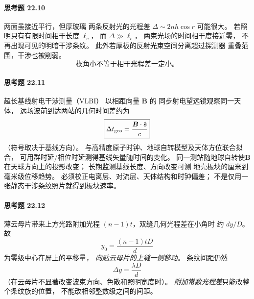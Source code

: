 \paragraph{思考题 22.10}
两面虽接近平行，但厚玻璃
两条反射光的光程差
\(\Delta\sim2nh\cos r\) 可能很大。
若照明只有有限时间相干长度 \(\ell_c\)，
而 \(\Delta\gg\ell_c\)，
两束光场的时间相干度接近零，
不再出现可见的明暗干涉条纹。
此外若厚板的反射光束空间分离超过探测器
重叠范围，干涉也被削弱。
\[
\boxed{\text{楔角小不等于相干光程差一定小。}}
\]

\paragraph{思考题 22.11}
超长基线射电干涉测量（VLBI）
以相距向量 \(\boldsymbol B\) 的
同步射电望远镜观察同一天体，
远场波前到达两站的几何时间差约为
\[
\boxed{\Delta t_{\rm geo}=
\frac{\boldsymbol B\cdot\hat{\boldsymbol s}}c}
\]
（符号取决于基线方向）。
与高精度原子时钟、地球自转模型及天体方位联合拟合，
可用群时延/相位时延测得基线矢量随时间的变化。
同一测站随地球自转使\(\boldsymbol B\)
在天球方向上的投影改变；
长期监测基线长度、方向改变可测
地壳板块的厘米到毫米级位移趋势。
必须校正电离层、对流层、天体结构和时钟偏差；
不是仅用一张静态干涉条纹照片就得到板块速率。

\paragraph{思考题 22.12}
薄云母片带来上方光路附加光程
\((n-1)t\)，双缝几何光程差在小角时
约 \(dy/D\)。
故
\[
\boxed{y_0=\frac{(n-1)tD}{d}}
\]
为零级中心在屏上的平移量，
\emph{向贴云母片的上缝一侧移动}。
条纹间距仍然
\[
\boxed{\Delta y=\frac{\lambda D}{d}}
\]
（在云母片不显著改变波束方向、色散和照明宽度时）。
\emph{附加常数光程差}只能改整个条纹族的位置，
不能改相邻整数级之间的间距。
